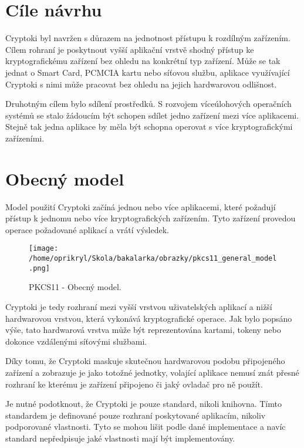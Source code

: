 \documentclass[]{fithesis3}
\begin{document}
	\section{Cíle návrhu}

	Cryptoki byl navržen s důrazem na jednotnost přístupu k rozdílným zařízením. Cílem rohraní je 		poskytnout vyšší aplikační vrstvě shodný přístup ke kryptografickému zařízení bez ohledu na 		konkrétní typ zařízení. Může se tak jednat o Smart Card, PCMCIA kartu nebo síťovou službu, 		aplikace využívající Cryptoki s nimi může pracovat bez ohledu na jejich hardwarovou odlišnost.

	Druhotným cílem bylo sdílení prostředků. S rozvojem víceúlohových operačních systémů se 		stalo žádoucím být schopen sdílet jedno zařízení mezi více aplikacemi. Stejně tak jedna 			aplikace by měla být schopna operovat s více kryptografickými zařízeními.

	\section{Obecný model}

	Model použití Cryptoki začíná jednou nebo více aplikacemi, které požadují přístup k jednomu 		nebo více kryptografických zařízením. Tyto zařízení provedou operace požadované aplikací a 		vrátí výsledek.
	\begin{figure}[!ht]
  		\begin{minipage}{1.00\textwidth}
    			\texttt{[image: /home/oprikryl/Skola/bakalarka/obrazky/pkcs11\_general\_model.png]}
  		\end{minipage}
 		\caption{PKCS11 - Obecný model.}
  		\label{fig:PKCS11 - Obecný model.}
	\end{figure}

	Cryptoki je tedy rozhraní mezi vyšší vrstvou uživatelských aplikací a nižší hardwarovou 			vrstvou, která vykonává kryptografické operace. Jak bylo popsáno výše, tato hardwarová 			vrstva může být reprezentována kartami, tokeny nebo dokonce vzdálenými síťovými službami.

	Díky tomu, že Cryptoki maskuje skutečnou hardwarovou podobu připojeného zařízení a 			zobrazuje je jako totožné jednotky, volající aplikace nemusí znát přesné rozhraní ke kterému je 		zařízení připojeno či jaký ovladač pro ně použít.

	Je nutné podotknout, že Cryptoki je pouze standard, nikoli knihovna. Tímto standardem je 			definované pouze rozhraní poskytované aplikacím, nikoliv podporované vlastnosti. Tyto se 			mohou lišit podle dané implementace a navíc standard nepředpisuje jaké vlastnosti mají být 			implementovány.
\end{document}
